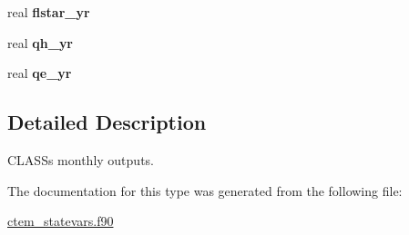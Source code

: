 \begin{DoxyCompactItemize}
\item 
\hypertarget{structctem__statevars_1_1class__moyr__output_a2c170085a3fee4ca9d79a13916077ee0}{}real {\bfseries flstar\+\_\+yr}\label{structctem__statevars_1_1class__moyr__output_a2c170085a3fee4ca9d79a13916077ee0}

\item 
\hypertarget{structctem__statevars_1_1class__moyr__output_af7c7ec3fb4d079015dc33d8e493e26f9}{}real {\bfseries qh\+\_\+yr}\label{structctem__statevars_1_1class__moyr__output_af7c7ec3fb4d079015dc33d8e493e26f9}

\item 
\hypertarget{structctem__statevars_1_1class__moyr__output_ac08485e4a8189fd2a36527285320372f}{}real {\bfseries qe\+\_\+yr}\label{structctem__statevars_1_1class__moyr__output_ac08485e4a8189fd2a36527285320372f}

\end{DoxyCompactItemize}


\subsection{Detailed Description}
C\+L\+A\+S\+S\textquotesingle{}s monthly outputs. 

The documentation for this type was generated from the following file\+:\begin{DoxyCompactItemize}
\item 
\hyperlink{ctem__statevars_8f90}{ctem\+\_\+statevars.\+f90}\end{DoxyCompactItemize}
